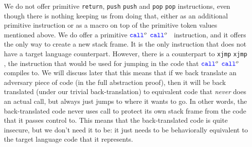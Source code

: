 \documentclass[a3paper]{article}
\newcommand\lau[1]{{\color{purple} \sf \footnotesize {LS: #1}}\\}
\newcommand\dominique[1]{{\color{purple} \sf \footnotesize {DD: #1}}\\}
\newcommand{\sourcecolor}{\color{blue}}
\newcommand{\src}[1]{{\sourcecolor #1}}
\newcommand{\zinstr}[1]{\texttt{#1}}
\newcommand{\oneinstr}[2]{
  \ifthenelse{\equal{#2}{}}
  {\zinstr{#1}}
  {\zinstr{#1} \; #2}
}
\newcommand{\twoinstr}[3]{
  \ifthenelse{\equal{#2#3}{}}
  {\zinstr{#1}}
  {\zinstr{#1} \; #2 \; #3}
}
\newcommand{\threeinstr}[4]{
  \ifthenelse{\equal{#2#3#4}{}}
  {\zinstr{#1}}
  {\zinstr{#1} \; #2 \; #3 \; #4}
}
\newcommand{\sreturn}{\zinstr{\src{return}}}
\newcommand{\spush}[1]{\oneinstr{\src{push}}{#1}}
\newcommand{\spop}[1]{\oneinstr{\src{pop}}{#1}}
\newcommand{\sxjmp}[2]{\twoinstr{\src{xjmp}}{#1}{#2}}
\newcommand{\scall}[4][]{  
\ifthenelse{\equal{#3#4}{}}
  {\ensuremath{\zinstr{\src{call}}_{#1}^{#2}}}
  {\ensuremath{\zinstr{\src{call}}_{#1}^{#2} \; #3 \; #4}}
}
\newcommand{\ssplice}[3]{\threeinstr{\src{splice}}{#1}{#2}{#3}}
\newcommand{\retptrd}{\mathrm{ret\text{-}ptr\text{-}data}}
\newcommand{\retptrc}{\mathrm{ret\text{-}ptr\text{-}code}}
\begin{document}
We do not offer primitive \sreturn{}, \spush{} and \spop{} instructions, even though there is nothing keeping us from doing that, either as an additional primitive instruction or as a macro on top of the primitive token values mentioned above.
We do offer a primitive \scall{o}{}{} instruction, and it offers the only way to create a new stack frame.
It is the only instruction that does not have a target language counterpart.
However, there is a counterpart to \sxjmp{}{}, the instruction that would be used for jumping in the code that \scall{o}{}{} compiles to.
We will discuss later that this means that if we back translate an adversary piece of code (in the full abstraction proof), then it will be back translated (under our trivial back-translation) to equivalent code that \emph{never} does an actual call, but always just jumps to where it wants to go.
In other words, the back-translated code never uses call to protect its own stack frame from the code that it passes control to.
This means that the back-translated code is quite insecure, but we don't need it to be: it just needs to be behaviorally equivalent to the target language code that it represents.

\end{document}
